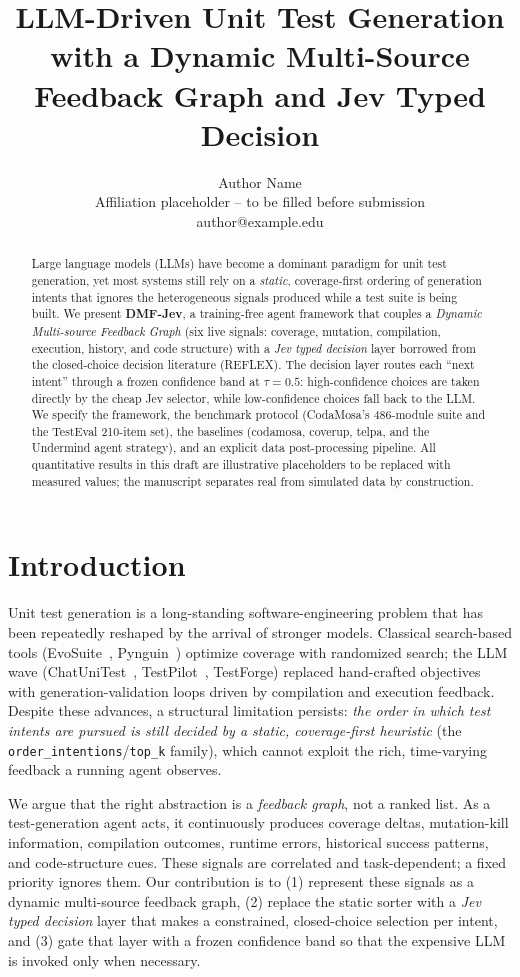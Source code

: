 \documentclass[11pt]{article}
\title{LLM-Driven Unit Test Generation with a Dynamic Multi-Source Feedback Graph and Jev Typed Decision}
\author{Author Name \\
Affiliation placeholder -- to be filled before submission \\
author@example.edu}
\date{}
\begin{document}
\maketitle

\begin{abstract}
Large language models (LLMs) have become a dominant paradigm for unit test generation, yet most systems still rely on a \emph{static}, coverage-first ordering of generation intents that ignores the heterogeneous signals produced while a test suite is being built. We present \textbf{DMF-Jev}, a training-free agent framework that couples a \emph{Dynamic Multi-source Feedback Graph} (six live signals: coverage, mutation, compilation, execution, history, and code structure) with a \emph{Jev typed decision} layer borrowed from the closed-choice decision literature (REFLEX). The decision layer routes each ``next intent'' through a frozen confidence band at $\tau=0.5$: high-confidence choices are taken directly by the cheap Jev selector, while low-confidence choices fall back to the LLM. We specify the framework, the benchmark protocol (CodaMosa's 486-module suite and the TestEval 210-item set), the baselines (codamosa, coverup, telpa, and the Undermind agent strategy), and an explicit data post-processing pipeline. All quantitative results in this draft are \textcolor{warn}{illustrative placeholders} to be replaced with measured values; the manuscript separates real from simulated data by construction.
\end{abstract}

\section{Introduction}
Unit test generation is a long-standing software-engineering problem that has been repeatedly reshaped by the arrival of stronger models. Classical search-based tools (EvoSuite~\cite{evosuite}, Pynguin~\cite{pynguin}) optimize coverage with randomized search; the LLM wave (ChatUniTest~\cite{chatunitest}, TestPilot~\cite{testpilot}, TestForge) replaced hand-crafted objectives with generation-validation loops driven by compilation and execution feedback. Despite these advances, a structural limitation persists: \emph{the order in which test intents are pursued is still decided by a static, coverage-first heuristic} (the \texttt{order\_intentions}/\texttt{top\_k} family), which cannot exploit the rich, time-varying feedback a running agent observes.

We argue that the right abstraction is a \emph{feedback graph}, not a ranked list. As a test-generation agent acts, it continuously produces coverage deltas, mutation-kill information, compilation outcomes, runtime errors, historical success patterns, and code-structure cues. These signals are correlated and task-dependent; a fixed priority ignores them. Our contribution is to (1) represent these signals as a dynamic multi-source feedback graph, (2) replace the static sorter with a \emph{Jev typed decision} layer that makes a constrained, closed-choice selection per intent, and (3) gate that layer with a frozen confidence band so that the expensive LLM is invoked only when necessary.
\end{document}
